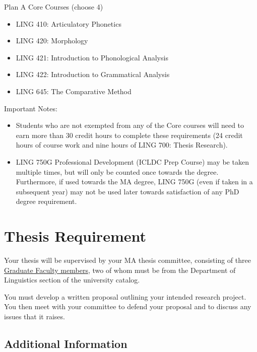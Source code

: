 \documentclass[
]{book}
\providecommand{\tightlist}{%
  \setlength{\itemsep}{0pt}\setlength{\parskip}{0pt}}
\begin{document}
Plan A Core Courses (choose 4)

\begin{itemize}
\tightlist
\item
  LING 410: Articulatory Phonetics
\item
  LING 420: Morphology
\item
  LING 421: Introduction to Phonological Analysis
\item
  LING 422: Introduction to Grammatical Analysis
\item
  LING 645: The Comparative Method
\end{itemize}

Important Notes:

\begin{itemize}
\tightlist
\item
  Students who are not exempted from any of the Core courses will need to earn more than 30 credit hours to complete these requirements (24 credit hours of course work and nine hours of LING 700: Thesis Research).
\item
  LING 750G Professional Development (ICLDC Prep Course) may be taken multiple times, but will only be counted once towards the degree. Furthermore, if used towards the MA degree, LING 750G (even if taken in a subsequent year) may not be used later towards satisfaction of any PhD degree requirement.
\end{itemize}

\hypertarget{thesis-requirement}{%
\section{Thesis Requirement}\label{thesis-requirement}}

Your thesis will be supervised by your MA thesis committee, consisting of three \href{http://manoa.hawaii.edu/graduate/content/select-committee-member}{Graduate Faculty members}, two of whom must be from the Department of Linguistics section of the university catalog.

You must develop a written proposal outlining your intended research project. You then meet with your committee to defend your proposal and to discuss any issues that it raises.

\hypertarget{additional-information}{%
\subsection{Additional Information}\label{additional-information}}
\end{document}
